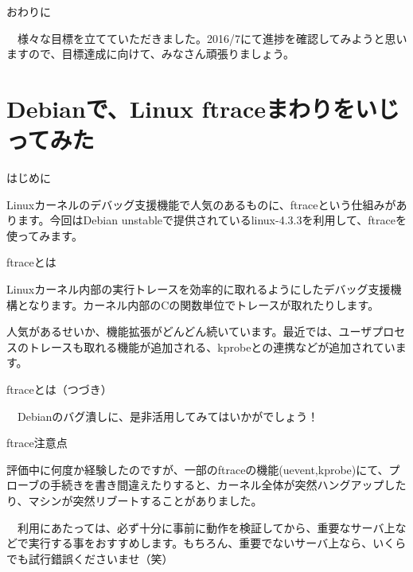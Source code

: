 \begin{frame}{おわりに}

　様々な目標を立てていただきました。2016/7にて進捗を確認してみようと思いますので、目標達成に向けて、みなさん頑張りましょう。
  
\end{frame}

\section{Debianで、Linux ftraceまわりをいじってみた}

\begin{frame}{はじめに}

 Linuxカーネルのデバッグ支援機能で人気のあるものに、ftraceという仕組みがあります。今回はDebian unstableで提供されているlinux-4.3.3を利用して、ftraceを使ってみます。
  
\end{frame}

\begin{frame}{ftraceとは}

  Linuxカーネル内部の実行トレースを効率的に取れるようにしたデバッグ支援機構となります。カーネル内部のCの関数単位でトレースが取れたりします。

  人気があるせいか、機能拡張がどんどん続いています。最近では、ユーザプロセスのトレースも取れる機能が追加される、kprobeとの連携などが追加されています。

\end{frame}

\begin{frame}{ftraceとは（つづき）}

　Debianのバグ潰しに、是非活用してみてはいかがでしょう！
  
\end{frame}

\begin{frame}{ftrace注意点}

  評価中に何度か経験したのですが、一部のftraceの機能(uevent,kprobe)にて、プローブの手続きを書き間違えたりすると、カーネル全体が突然ハングアップしたり、マシンが突然リブートすることがありました。

　利用にあたっては、必ず十分に事前に動作を検証してから、重要なサーバ上などで実行する事をおすすめします。もちろん、重要でないサーバ上なら、いくらでも試行錯誤くださいませ（笑）
  
\end{frame}

